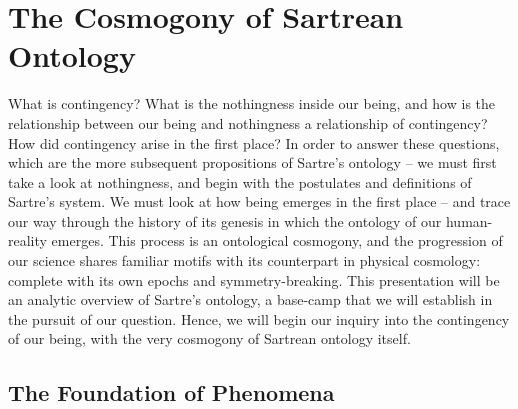 \chapter{The Cosmogony of Sartrean Ontology}


What is contingency? What is the nothingness inside our being, and how is the relationship between our being and nothingness a relationship of contingency? How did contingency arise in the first place? In order to answer these questions, which are the more subsequent propositions of Sartre's ontology -- we must first take a look at nothingness, and begin with the postulates and definitions of Sartre's system. We must look at how being emerges in the first place -- and trace our way through the history of its genesis in which the ontology of our human-reality emerges. This process is an ontological cosmogony, and the progression of our science shares familiar motifs with its counterpart in physical cosmology: complete with its own epochs and symmetry-breaking. This presentation will be an analytic overview of Sartre's ontology, a base-camp that we will establish in the pursuit of our question. Hence, we will begin our inquiry into the contingency of our being, with the very cosmogony of Sartrean ontology itself.

\section{The Foundation of Phenomena}

